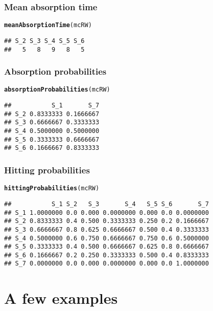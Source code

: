 \documentclass[aspectratio=169]{beamer}\usepackage[]{graphicx}\usepackage[]{xcolor}
\makeatletter
\newcommand{\hldef}[1]{\textcolor[rgb]{0.345,0.345,0.345}{#1}}%
\newcommand{\hlkwd}[1]{\textcolor[rgb]{0.737,0.353,0.396}{\textbf{#1}}}%
\newenvironment{kframe}{%
 \def\at@end@of@kframe{}%
 \ifinner\ifhmode%
  \def\at@end@of@kframe{\end{minipage}}%
  \begin{minipage}{\columnwidth}%
 \fi\fi%
 \def\FrameCommand##1{\hskip\@totalleftmargin \hskip-\fboxsep
 \colorbox{shadecolor}{##1}\hskip-\fboxsep
     \hskip-\linewidth \hskip-\@totalleftmargin \hskip\columnwidth}%
 \MakeFramed {\advance\hsize-\width
   \@totalleftmargin\z@ \linewidth\hsize
   \@setminipage}}%
 {\par\unskip\endMakeFramed%
 \at@end@of@kframe}
\newenvironment{knitrout}{}{} %
\makeatother
\begin{document}
\begin{frame}[fragile]\frametitle{Mean absorption time}
\begin{knitrout}
\color{fgcolor}\begin{kframe}
\begin{alltt}
\hlkwd{meanAbsorptionTime}\hldef{(mcRW)}
\end{alltt}
\begin{verbatim}
## S_2 S_3 S_4 S_5 S_6 
##   5   8   9   8   5
\end{verbatim}
\end{kframe}
\end{knitrout}
\end{frame}

\begin{frame}[fragile]\frametitle{Absorption probabilities}
\begin{knitrout}
\color{fgcolor}\begin{kframe}
\begin{alltt}
\hlkwd{absorptionProbabilities}\hldef{(mcRW)}
\end{alltt}
\begin{verbatim}
##           S_1       S_7
## S_2 0.8333333 0.1666667
## S_3 0.6666667 0.3333333
## S_4 0.5000000 0.5000000
## S_5 0.3333333 0.6666667
## S_6 0.1666667 0.8333333
\end{verbatim}
\end{kframe}
\end{knitrout}
\end{frame}

\begin{frame}[fragile]\frametitle{Hitting probabilities}
\begin{knitrout}
\color{fgcolor}\begin{kframe}
\begin{alltt}
\hlkwd{hittingProbabilities}\hldef{(mcRW)}
\end{alltt}
\begin{verbatim}
##           S_1 S_2   S_3       S_4   S_5 S_6       S_7
## S_1 1.0000000 0.0 0.000 0.0000000 0.000 0.0 0.0000000
## S_2 0.8333333 0.4 0.500 0.3333333 0.250 0.2 0.1666667
## S_3 0.6666667 0.8 0.625 0.6666667 0.500 0.4 0.3333333
## S_4 0.5000000 0.6 0.750 0.6666667 0.750 0.6 0.5000000
## S_5 0.3333333 0.4 0.500 0.6666667 0.625 0.8 0.6666667
## S_6 0.1666667 0.2 0.250 0.3333333 0.500 0.4 0.8333333
## S_7 0.0000000 0.0 0.000 0.0000000 0.000 0.0 1.0000000
\end{verbatim}
\end{kframe}
\end{knitrout}
\end{frame}


\section{A few examples}
\end{document}
